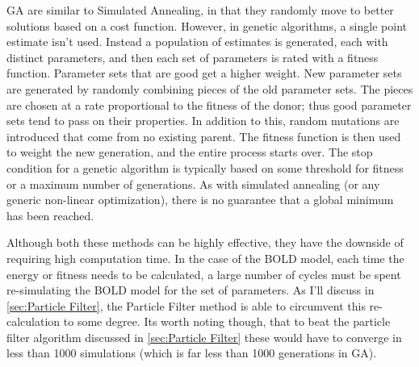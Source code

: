\ac{GA} are similar to Simulated Annealing, in
that they randomly move to better solutions based on a cost function.
However, in genetic algorithms, a single point estimate isn't used. Instead
a population of estimates is generated, each with distinct parameters,
and then each set of parameters is rated with a fitness function. Parameter
sets that are good get a higher weight. New parameter sets are generated by 
randomly combining pieces of the old parameter sets. The pieces are 
chosen at a rate proportional to the fitness of the donor; thus good
parameter sets tend to pass on their properties. In addition to this,
random mutations are introduced that come from no existing parent. 
The fitness function is then used to weight the new generation, and
the entire process starts over. The stop condition for a genetic algorithm
is typically based on some threshold for fitness or a maximum number 
of generations. As with simulated annealing (or any generic non-linear optimization),
there is no guarantee that a global minimum has been reached.


Although both these methods can be highly effective, they have the downside of
requiring high computation time. In the case of the \ac{BOLD} model,
each time the energy or fitness needs to be calculated, a large number of cycles
must be spent re-simulating the \ac{BOLD} model for the set of parameters. As I'll
discuss in \autoref{sec:Particle Filter}, the Particle Filter method is able
to circumvent this re-calculation to some degree. Its worth noting though, that 
to beat the particle filter algorithm discussed in \autoref{sec:Particle Filter} 
these would have to converge in less than 1000 simulations (which is far less than
1000 generations in \ac{GA}). 

